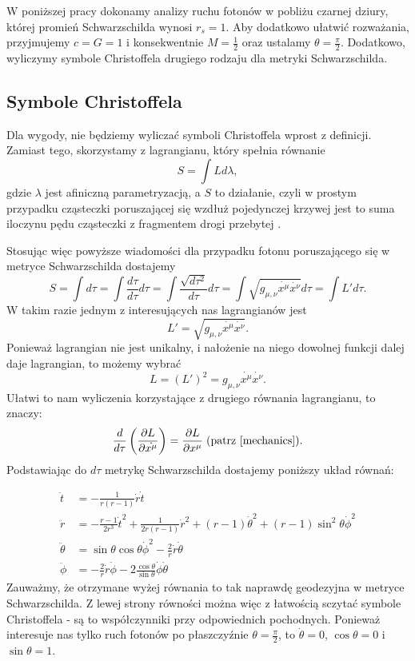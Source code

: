 W poniższej pracy dokonamy analizy ruchu fotonów w pobliżu czarnej dziury, której promień Schwarzschilda wynosi $r_s=1$. Aby dodatkowo ułatwić rozważania, przyjmujemy $c=G=1$ i konsekwentnie $M=\frac{1}{2}$ oraz ustalamy $\theta=\frac{\pi}{2}$. Dodatkowo, wyliczymy symbole Christoffela drugiego rodzaju dla metryki Schwarzschilda.

\subsection{Symbole Christoffela}

Dla wygody, nie będziemy wyliczać symboli Christoffela wprost z definicji. Zamiast tego, skorzystamy z lagrangianu, który spełnia równanie
$$ S = \int L d \lambda, $$
gdzie $\lambda$ jest afiniczną parametryzacją, a $S$ to działanie, czyli w prostym przypadku cząsteczki poruszającej się wzdłuż pojedynczej krzywej jest to suma iloczynu pędu cząsteczki z fragmentem drogi przebytej \cite{mechanics}. 

Stosując więc powyższe wiadomości dla przypadku fotonu poruszającego się w metryce Schwarzschilda dostajemy
$$ S = \int d \tau= \int \frac{d \tau}{d \tau} d \tau = \int \frac{\sqrt{d \tau^2}}{d \tau} d \tau = \int \sqrt{g_{\mu, \nu}\dot{x^\mu} \dot{x^\nu}}d \tau = \int L' d \tau. $$
W takim razie jednym z interesujących nas lagrangianów jest 
$$L'=\sqrt{g_{\mu, \nu}\dot{x^\mu}\dot{x^\nu}}.$$ 
Ponieważ lagrangian nie jest unikalny, i nałożenie na niego dowolnej funkcji dalej daje lagrangian, to możemy wybrać
$$L=(L')^2 = g_{\mu,\nu}\dot{x^\mu}\dot{x^\nu}.$$
Ułatwi to nam wyliczenia korzystające z drugiego równania lagrangianu, to znaczy:
$$\frac{d}{ d \tau}\left(\frac{\partial L}{\partial \dot{x^\mu}}\right)= \frac{\partial L}{\partial x^\mu}\; (\text{patrz \cite{mechanics}}). $$
Podstawiając do $d \tau$ metrykę Schwarzschilda dostajemy poniższy układ równań:

\begin{align*}
  \ddot{t}&=-\frac{1}{r(r-1)}\dot{r}\dot{t}\\
  \ddot{r}&=-\frac{r-1}{ 2r^3} \dot{t}^2+\frac{1}{2r(r-1)}\dot{r}^2+(r-1)\dot{\theta}^2+(r-1)\sin^2\theta \dot{\phi}^2\\
  \ddot{\theta} &= \sin \theta \cos \theta \dot{\phi}^2 - \frac{2}{ r} \dot{r}\dot{\theta}\\
  \ddot{\phi} &= -\frac{2}{r} \dot{r}\dot{\phi} - 2 \frac{\cos \theta}{ \sin \theta} \dot{\phi}  \dot{\theta} 
\end{align*}
Zauważmy, że otrzymane wyżej równania to tak naprawdę geodezyjna w metryce Schwarzschilda. Z lewej strony równości można więc z łatwością sczytać symbole Christoffela - są to współczynniki przy odpowiednich pochodnych. Ponieważ interesuje nas tylko ruch fotonów po płaszczyźnie $\theta=\frac{\pi}{2}$, to $\dot{\theta}=0$, $\cos \theta=0$ i $\sin \theta=1$.

